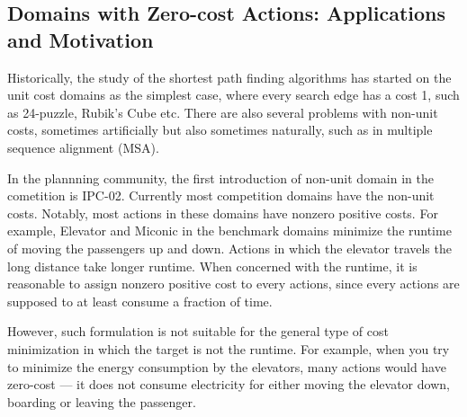 \subsection{Domains with Zero-cost Actions: Applications and Motivation}



Historically, the study of the shortest path finding algorithms has
started on the unit cost domains as the simplest case, where every
search edge has a cost 1,
such as 24-puzzle, Rubik's Cube etc.
There are also several problems with non-unit costs, sometimes
artificially but also sometimes naturally, such as in multiple
sequence alignment (MSA).

In the plannning community, the first introduction of non-unit domain in
the cometition is IPC-02. Currently most competition domains have the
non-unit costs. 
Notably, most actions in these domains have nonzero positive costs.
% 
% 
% 
For example, Elevator and Miconic in the benchmark domains minimize the
runtime of moving the passengers up and down.  Actions in which the
elevator travels the long distance take longer runtime.  When concerned
with the runtime, it is reasonable to assign nonzero positive cost to
every actions, since every actions are supposed to at least consume a
fraction of time.

However, such formulation is not suitable for the general type of cost
minimization in which the target is not the runtime.  For example, when
you try to minimize the energy consumption by the elevators, many
actions would have zero-cost --- it does not consume electricity for
either moving the elevator down, boarding or leaving the passenger.
 
